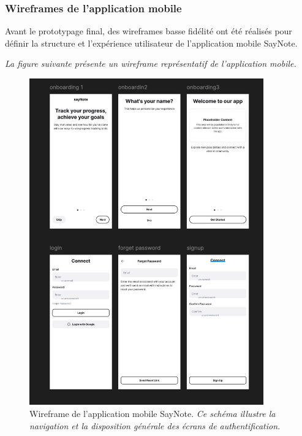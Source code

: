     
    
    \subsubsection{Wireframes de l'application mobile}
    
    Avant le prototypage final, des wireframes basse fidélité ont été réalisés pour définir la structure et l'expérience utilisateur de l'application mobile SayNote.
    
        \textit{La figure suivante présente un wireframe représentatif de l'application mobile.}
    \begin{figure}[H]
        \centering
        \includegraphics[width=0.9\textwidth]{assets/docs/mobile/wireframe_app-1.jpg}
        \caption{Wireframe de l'application mobile SayNote. \newline\textit{Ce schéma illustre la navigation et la disposition générale des écrans de authentification.}}
        \label{fig:wireframe_app_auth}
    \end{figure}
    
